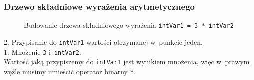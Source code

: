 \documentclass[10pt,t]{beamer}
\begin{document}
\begin{frame}
  \frametitle{Drzewo składniowe wyrażenia arytmetycznego}


  \begin{figure}


    \caption{Budowanie drzewa składniowego wyrażenia
      \texttt{intVar1 = 3 * intVar2}}

    \label{fig:Scheme-of-CPU}

  \end{figure}





  2. Przypisanie do \texttt{intVar1} wartości otrzymanej w~punkcie jeden. \\
  1. Mnożenie \texttt{3} i~\texttt{intVar2}. \\
  Wartość jaką przypiszemy do \texttt{intVar1} jest wynikiem mnożenia,
  więc w~prawym węźle musimy umieścić operator binarny \texttt{*}.

\end{frame}
\end{document}
